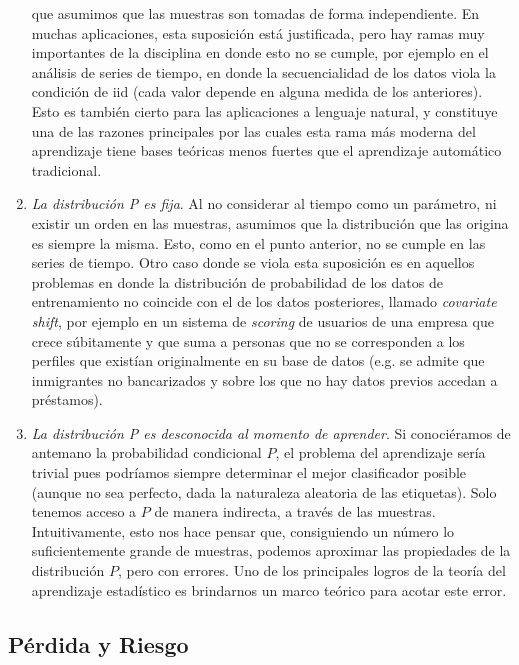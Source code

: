 \documentclass{article}
\begin{document}
\begin{enumerate}
    que asumimos que las muestras son tomadas de forma independiente. En muchas aplicaciones, esta suposición está justificada, pero
    hay ramas muy importantes de la disciplina en donde esto no se cumple, por ejemplo en el análisis de series de tiempo, en donde
    la secuencialidad de los datos viola la condición de iid (cada valor depende en alguna medida de los anteriores). Esto es también 
    cierto para las aplicaciones a lenguaje natural, y constituye una de las razones principales por las cuales esta rama más moderna 
    del aprendizaje tiene bases teóricas menos fuertes que el aprendizaje automático tradicional.
    \item \textit{La distribución P es fija}. Al no considerar al tiempo como un parámetro, ni existir un orden en las muestras, asumimos
    que la distribución que las origina es siempre la misma. Esto, como en el punto anterior, no se cumple en las series de tiempo. Otro
    caso donde se viola esta suposición es en aquellos problemas en donde la distribución de probabilidad de los datos de entrenamiento no
    coincide con el de los datos posteriores, llamado \textit{covariate shift}, por ejemplo en un sistema de \textit{scoring} de usuarios
    de una empresa que crece súbitamente y que suma a personas que no se corresponden a los perfiles que existían originalmente en su base
    de datos (e.g. se admite que inmigrantes no bancarizados y sobre los que no hay datos previos accedan a préstamos).
    \item \textit{La distribución P es desconocida al momento de aprender}. Si conociéramos de antemano la probabilidad condicional $P$,
    el problema del aprendizaje sería trivial pues podríamos siempre determinar el mejor clasificador posible (aunque no sea perfecto,
    dada la naturaleza aleatoria de las etiquetas). Solo tenemos acceso a $P$ de manera indirecta, a través de las muestras. Intuitivamente,
    esto nos hace pensar que, consiguiendo un número lo suficientemente grande de muestras, podemos aproximar las propiedades de la distribución
    $P$, pero con errores. Uno de los principales logros de la teoría del aprendizaje estadístico es brindarnos un marco teórico para
    acotar este error.
\end{enumerate}

\subsection{Pérdida y Riesgo}
\end{document}
